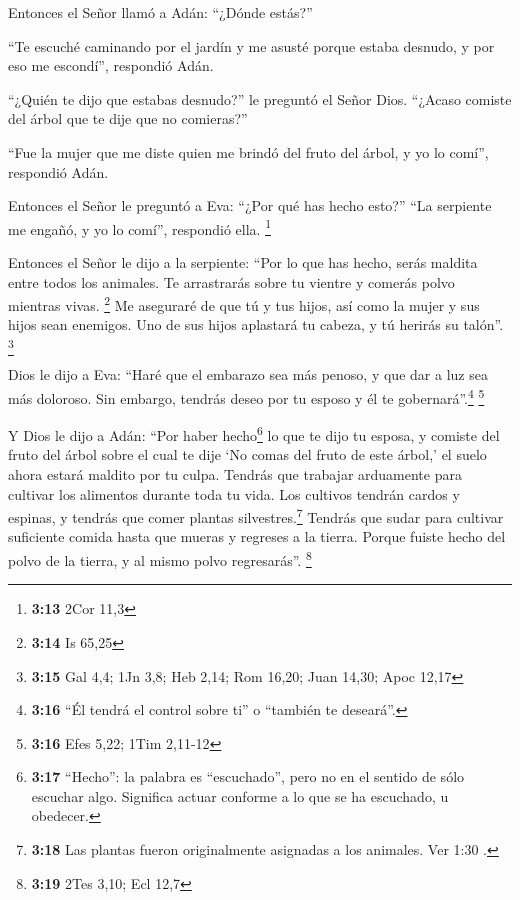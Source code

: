  Entonces el Señor llamó a Adán: ``¿Dónde estás?''

 ``Te escuché caminando por el jardín y me asusté porque
estaba desnudo, y por eso me escondí'', respondió Adán.

 ``¿Quién te dijo que estabas desnudo?'' le preguntó el
Señor Dios. ``¿Acaso comiste del árbol que te dije que no comieras?''

 ``Fue la mujer que me diste quien me brindó del fruto
del árbol, y yo lo comí'', respondió Adán.

 Entonces el Señor le preguntó a Eva: ``¿Por qué has
hecho esto?'' ``La serpiente me engañó, y yo lo comí'', respondió ella.
\footnote{\textbf{3:13} 2Cor 11,3}

 Entonces el Señor le dijo a la serpiente: ``Por lo que
has hecho, serás maldita entre todos los animales. Te arrastrarás sobre
tu vientre y comerás polvo mientras vivas. \footnote{\textbf{3:14} Is
  65,25}  Me aseguraré de que tú y tus hijos, así como la
mujer y sus hijos sean enemigos. Uno de sus hijos aplastará tu cabeza, y
tú herirás su talón''. \footnote{\textbf{3:15} Gal 4,4; 1Jn 3,8; Heb
  2,14; Rom 16,20; Juan 14,30; Apoc 12,17}

 Dios le dijo a Eva: ``Haré que el embarazo sea más
penoso, y que dar a luz sea más doloroso. Sin embargo, tendrás deseo por
tu esposo y él te gobernará''.\footnote{\textbf{3:16} ``Él tendrá el
  control sobre ti'' o ``también te deseará''.} \footnote{\textbf{3:16}
  Efes 5,22; 1Tim 2,11-12}

 Y Dios le dijo a Adán: ``Por haber hecho\footnote{\textbf{3:17}
  ``Hecho'': la palabra es ``escuchado'', pero no en el sentido de sólo
  escuchar algo. Significa actuar conforme a lo que se ha escuchado, u
  obedecer.} lo que te dijo tu esposa, y comiste del fruto del árbol
sobre el cual te dije `No comas del fruto de este árbol,' el suelo ahora
estará maldito por tu culpa. Tendrás que trabajar arduamente para
cultivar los alimentos durante toda tu vida.  Los
cultivos tendrán cardos y espinas, y tendrás que comer plantas
silvestres.\footnote{\textbf{3:18} Las plantas fueron originalmente
  asignadas a los animales. Ver 1:30 .}  Tendrás que
sudar para cultivar suficiente comida hasta que mueras y regreses a la
tierra. Porque fuiste hecho del polvo de la tierra, y al mismo polvo
regresarás''. \footnote{\textbf{3:19} 2Tes 3,10; Ecl 12,7}

